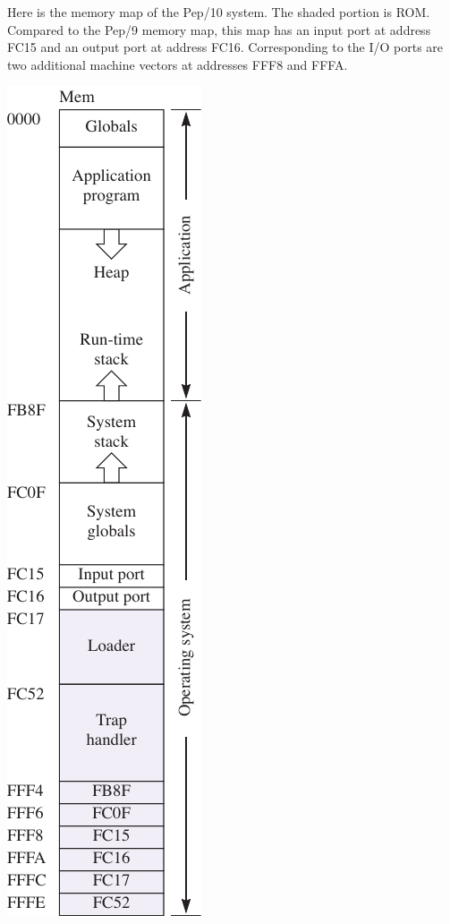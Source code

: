\documentclass[10pt,fleqn]{book}
\begin{document}
\noindent Here is the memory map of the Pep/10 system.
The shaded portion is ROM.
Compared to the Pep/9 memory map, this map has an input port at address FC15 and an output port at address FC16.
Corresponding to the I/O ports are two additional machine vectors at addresses FFF8 and FFFA.\\
\begin{center}
\includegraphics{memory-map.pdf}
\end{center}
\end{document}
